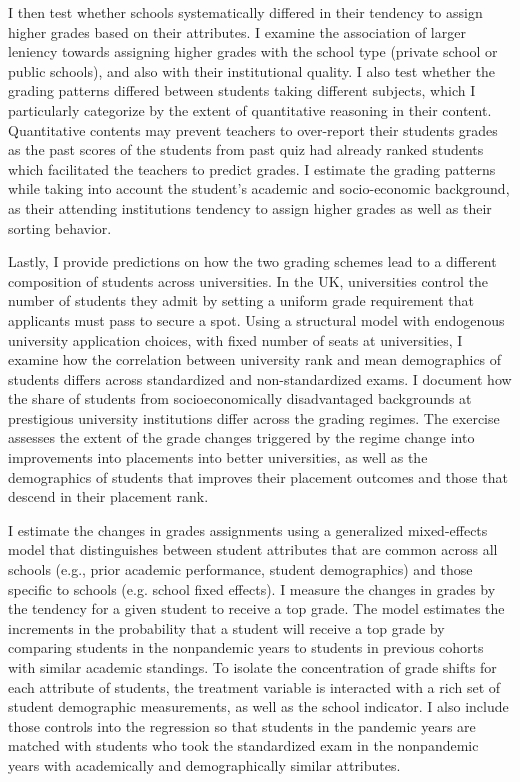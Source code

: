 I then test whether schools systematically differed in their tendency to assign higher grades based on their attributes. I examine the association of larger leniency towards assigning higher grades with the school type (private school or public schools), and also with their institutional quality. I also test whether the grading patterns differed between students taking different subjects, which I particularly categorize by the extent of quantitative reasoning in their content. Quantitative contents may prevent teachers to over-report their students grades as the past scores of the students from past quiz had already ranked students which facilitated the teachers to predict grades. I estimate the grading patterns while taking into account the student's academic and socio-economic background, as their attending institutions tendency to assign higher grades as well as their sorting behavior.

Lastly, I provide predictions on how the two grading schemes lead to a different composition of students across universities. In the UK, universities control the number of students they admit by setting a uniform grade requirement that applicants must pass to secure a spot. Using a structural model with endogenous university application choices, with fixed number of seats at universities, I examine how the correlation between university rank and mean demographics of students differs across standardized and non-standardized exams. I document how the share of students from socioeconomically disadvantaged backgrounds at prestigious university institutions differ across the grading regimes. The exercise assesses the extent of the grade changes triggered by the regime change into improvements into placements into better universities, as well as the demographics of students that improves their placement outcomes and those that descend in their placement rank.

\vspace{1em}

I estimate the changes in grades assignments using a generalized mixed-effects model that distinguishes between student attributes that are common across all schools (e.g., prior academic performance, student demographics) and those specific to schools (e.g. school fixed effects). I measure the changes in grades by the tendency for a given student to receive a top grade. The model estimates the increments in the probability that a student will receive a top grade by comparing students in the nonpandemic years to students in previous cohorts with similar academic standings. To isolate the concentration of grade shifts for each attribute of students, the treatment variable is interacted with a rich set of student demographic measurements, as well as the school indicator. I also include those controls into the regression so that students in the pandemic years are matched with students who took the standardized exam in the nonpandemic years with academically and demographically similar attributes. 

